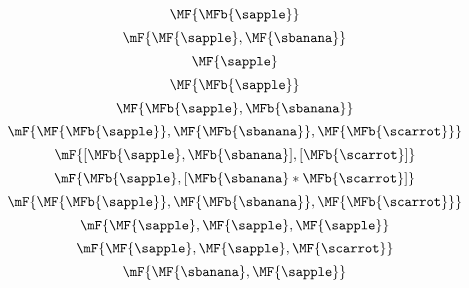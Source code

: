 {\begin{forslides}
\begin{equation}
    \end{equation}
    \begin{equation}
        \label{eq:fruit-sum-5}
        \MF{\MFb{\sapple}}
    \end{equation}
    \begin{equation}
        \label{eq:fruit-sum-6}
        \mF {\MF{\sapple}  ,  \MF{\sbanana}}
    \end{equation}
    \begin{equation}
        \label{eq:fruit-sum-6a}
        \MF{\sapple}
    \end{equation}
    \begin{equation}
        \label{eq:fruit-sum-6b}
        \MF{\MFb{\sapple}}
    \end{equation}
    \begin{equation}
        \label{eq:fruit-sum-6-bis}
        \MF{\MFb{\sapple}  , \MFb{\sbanana}}
    \end{equation}
    \begin{equation}
        \label{eq:fruit-sum-7}
        \mF {\MF{\MFb{\sapple}} , \MF{\MFb{\sbanana}}  , \MF{\MFb{\scarrot}}}
    \end{equation}
    \begin{equation}
        \label{eq:fruit-sum-7-bis}
        \mF{[\MFb{\sapple}  , \MFb{\sbanana}] ,  [\MFb{\scarrot}]}
    \end{equation}
    \begin{equation}
        \label{eq:fruit-sum-8}
        \mF{\MFb{\sapple}   , [\MFb{\sbanana}  * \MFb{\scarrot}]}
    \end{equation}
    \begin{equation}
        \label{eq:fruit-sum-9}
        \mF{\MF{\MFb{\sapple}}  , \MF{\MFb{\sbanana}} ,  \MF{\MFb{\scarrot}}}
    \end{equation}
    \begin{equation}
        \label{eq:fruit-sum-10}
        \mF{\MF{\sapple}   ,  \MF{\sapple}  ,  \MF{\sapple}}
    \end{equation}
    \begin{equation}
        \label{eq:fruit-sum-11}
        \mF{\MF{\sapple}   , \MF{\sapple}  ,\MF{\scarrot}}
    \end{equation}
    \begin{equation}
        \label{eq:fruit-sum-12}
        \mF{\MF{\sbanana} , \MF{\sapple}}
    \end{equation}
    \begin{equation}

\end{equation}
\end{forslides}}
